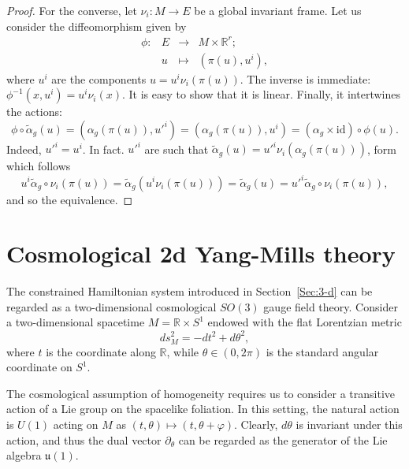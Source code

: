 \documentclass{article}
\numberwithin{equation}{section}
\theoremstyle{definition}
\newcommand{\R}{\mathbb{R}}
\begin{document}
\begin{proof}
For the converse, let $\nu_i:M\to E$ be a global invariant frame. Let us consider the diffeomorphism given by
\begin{equation*}
\begin{matrix}
    \phi:&E&\to &M\times \R^r;\\
    &u&\mapsto & (\pi(u),u^i),
\end{matrix}
\end{equation*}
where $u^i$ are the components $u=u^i\nu_i(\pi(u))$. The inverse is immediate: $\phi^{-1}(x,u^i)=u^i\nu_i(x)$. It is easy to show that it is linear. Finally, it intertwines the actions:
\begin{equation*}
    \phi\circ \tilde \alpha_g(u)=(\alpha_g(\pi(u)),u'^i)=(\alpha_g(\pi(u)),u^i)=(\alpha_g\times\mathrm{id})\circ \phi(u).
\end{equation*}
Indeed, $u'^i=u^i$. In fact. $u'^i$ are such that $\tilde\alpha_g(u)=u'^i\nu_i(\alpha_g(\pi(u)))$, form which follows
\begin{equation*}
    u^i\tilde\alpha_g\circ \nu_i(\pi(u))=\tilde\alpha_g(u^i\nu_i(\pi(u)))= \tilde\alpha_g(u)=u'^i\tilde\alpha_g\circ \nu_i(\pi(u)),
\end{equation*}
and so the equivalence.
\end{proof}



\section{Cosmological 2d Yang-Mills theory}
\label{App:B}
The constrained Hamiltonian system introduced in Section~\ref{Sec:3-d} can be regarded as a two-dimensional cosmological $SO(3)$ gauge field theory. Consider a two-dimensional spacetime $M=\mathbb{R}\times S^1$ endowed with the flat Lorentzian metric
\[
ds^2_M=-dt^2+d\theta^2,
\]
where $t$ is the coordinate along $\mathbb{R}$, while $\theta\in(0,2\pi)$ is the standard angular coordinate on $S^1$.  

The cosmological assumption of homogeneity requires us to consider a transitive action of a Lie group on the spacelike foliation. In this setting, the natural action is $U(1)$ acting on $M$ as $(t,\theta)\mapsto(t,\theta+\varphi)$. Clearly, $d\theta$ is invariant under this action, and thus the dual vector $\partial_{\theta}$ can be regarded as the generator of the Lie algebra $\mathfrak{u}(1)$.  
\end{document}
